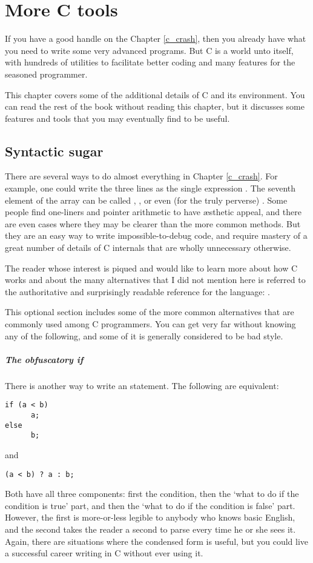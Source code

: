 \chapter{\treesymbol More C tools} \label{ctwo}

If you have a good handle on the Chapter \ref{c_crash}, then you already
have what you need to write some very advanced programs. But C is a
world unto itself, with hundreds of utilities to facilitate better
coding and many features for the seasoned programmer.

This chapter covers some of the additional details of C and its
environment. You can read the rest of the book without reading this
chapter, but it discusses some features and tools that you may
eventually find to be useful.


\section{Syntactic sugar}   
There are several ways to do almost everything in Chapter \ref{c_crash}.  For
example, one could write the three lines  as the single expression . The seventh
element of the array  can be called ,
, or even (for the truly perverse) .  Some people find one-liners and pointer arithmetic
to have \ae{}sthetic appeal, and there are even cases where they may
be clearer than the more common methods. But they are an easy way to
write impossible-to-debug code, and require mastery of a great number
of details of C internals that are wholly unnecessary otherwise.

The reader whose interest is piqued and would like to learn more about
how C works and about the many alternatives that I did not mention here
is referred to the authoritative and surprisingly readable reference
for the language: \cite{kandr:c}.

This optional section includes some of the more common alternatives that
are commonly used among C programmers. You can get very far without
knowing any of the following, and some of it is generally considered to
be bad style.

\paragraph{The obfuscatory if} There is another way to write an  statement. The following are equivalent:
\begin{lstlisting}
if (a < b)
      a;
else
      b;
\end{lstlisting}
and
\begin{lstlisting}
(a < b) ? a : b;
\end{lstlisting}
Both have all three components: first the condition, then the `what to do if the
condition is true' part, and then the `what to do if the condition is false'
part. However, the first is more-or-less legible to anybody who knows basic English,
and the second takes the reader a second to parse every time he or she
sees it. Again, there are situations where the condensed form is useful,
but you could live a successful career writing in C without ever using it.



